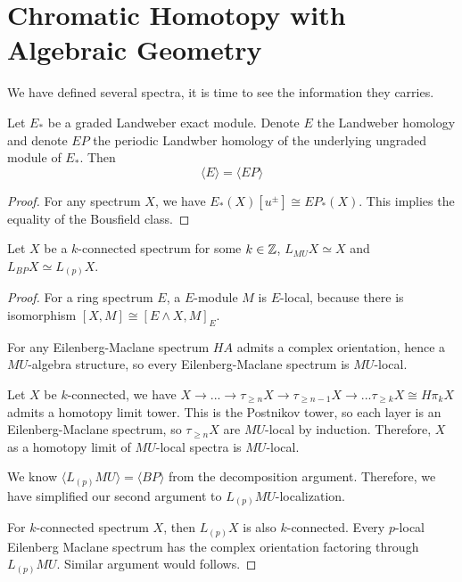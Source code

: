 \section{Chromatic Homotopy with Algebraic Geometry}\label{sec:chromatic-more-chromaticlayers}
We have defined several spectra, it is time to see the information they carries.

\begin{lemma}
    Let $E_*$ be a graded Landweber exact module. Denote $E$ the Landweber homology and denote $EP$ the periodic Landwber homology of the underlying ungraded module of $E_*$. Then 
    \[
        \langle E \rangle =\langle EP\rangle
    \] 
\end{lemma}
\begin{proof}
    For any spectrum $X$, we have $E_*(X)[u^{\pm}]\cong EP_*(X)$. This implies the equality of the Bousfield class.
\end{proof}

\begin{proposition}
    Let $X$ be a $k$-connected spectrum for some $k\in \mathbb{Z}$, $L_{MU}X\simeq X$ and $L_{BP}X\simeq L_{(p)}X$.
\end{proposition}
\begin{proof}
    For a ring spectrum $E$, a $E$-module $M$ is $E$-local, because there is isomorphism $[X, M]\cong [E\wedge X, M]_E$.

    For any Eilenberg-Maclane spectrum $HA$ admits a complex orientation, hence a $MU$-algebra structure, so every 
    Eilenberg-Maclane spectrum is $MU$-local.

    Let $X$ be $k$-connected, we have $X\to ... \to \tau_{\geq n}X\to \tau_{\geq n-1}X\to ...\tau_{\geq k}X\cong H\pi_kX$ 
    admits a homotopy limit tower. This is the Postnikov tower, so each layer is an Eilenberg-Maclane spectrum, so 
    $\tau_{\geq n}X$ are $MU$-local by induction. Therefore, $X$ as a homotopy limit of $MU$-local spectra is $MU$-local.

    We know $\langle L_{(p)}MU\rangle =\langle BP\rangle$ from the decomposition argument. Therefore, we have simplified our 
    second argument to $L_{(p)}MU$-localization.

    For $k$-connected spectrum $X$, then $L_{(p)}X$ is also $k$-connected. Every $p$-local Eilenberg Maclane spectrum has the 
    complex orientation factoring through $L_{(p)}MU$. Similar argument would follows.
\end{proof}

